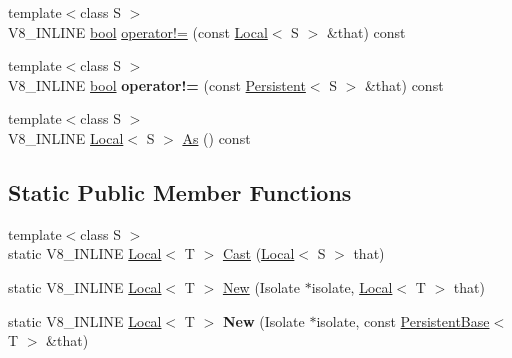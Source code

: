 \begin{DoxyCompactItemize}
\item 
{\footnotesize template$<$class S $>$ }\\V8\+\_\+\+I\+N\+L\+I\+NE \mbox{\hyperlink{classbool}{bool}} \mbox{\hyperlink{classv8_1_1Local_a3b2ae1c0415d319099ebc2fd059dbb10}{operator!=}} (const \mbox{\hyperlink{classv8_1_1Local}{Local}}$<$ S $>$ \&that) const
\item 
\mbox{\label{classv8_1_1Local_a8c75d7c45f0d922f3dd842f96fb5c5cf}} 
{\footnotesize template$<$class S $>$ }\\V8\+\_\+\+I\+N\+L\+I\+NE \mbox{\hyperlink{classbool}{bool}} {\bfseries operator!=} (const \mbox{\hyperlink{classv8_1_1Persistent}{Persistent}}$<$ S $>$ \&that) const
\item 
{\footnotesize template$<$class S $>$ }\\V8\+\_\+\+I\+N\+L\+I\+NE \mbox{\hyperlink{classv8_1_1Local}{Local}}$<$ S $>$ \mbox{\hyperlink{classv8_1_1Local_afa242d21780a729341644a615c4e6ea1}{As}} () const
\end{DoxyCompactItemize}
\subsection*{Static Public Member Functions}
\begin{DoxyCompactItemize}
\item 
{\footnotesize template$<$class S $>$ }\\static V8\+\_\+\+I\+N\+L\+I\+NE \mbox{\hyperlink{classv8_1_1Local}{Local}}$<$ T $>$ \mbox{\hyperlink{classv8_1_1Local_a95c8aa28ad098dd160ddd8cb60377bd6}{Cast}} (\mbox{\hyperlink{classv8_1_1Local}{Local}}$<$ S $>$ that)
\item 
static V8\+\_\+\+I\+N\+L\+I\+NE \mbox{\hyperlink{classv8_1_1Local}{Local}}$<$ T $>$ \mbox{\hyperlink{classv8_1_1Local_a1b3c386fb10d9e8f67aecec9174de1fa}{New}} (Isolate $\ast$isolate, \mbox{\hyperlink{classv8_1_1Local}{Local}}$<$ T $>$ that)
\item 
\mbox{\label{classv8_1_1Local_a9ffe326224dc9b8a0b47d61b1f877741}} 
static V8\+\_\+\+I\+N\+L\+I\+NE \mbox{\hyperlink{classv8_1_1Local}{Local}}$<$ T $>$ {\bfseries New} (Isolate $\ast$isolate, const \mbox{\hyperlink{classv8_1_1PersistentBase}{Persistent\+Base}}$<$ T $>$ \&that)
\end{DoxyCompactItemize}
